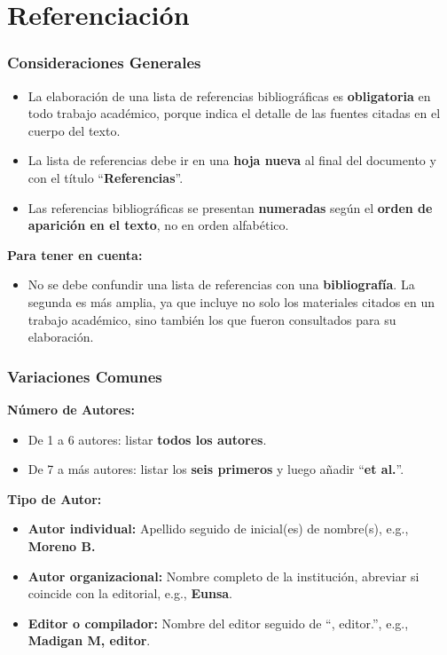 \documentclass[
11pt, %
]{beamer}
\begin{document}
\section{Referenciación}

\begin{frame}
	\frametitle{Consideraciones Generales}

	\begin{itemize}
		\item La elaboración de una lista de referencias bibliográficas es \textbf{obligatoria} en todo trabajo académico, porque indica el detalle de las fuentes citadas en el cuerpo del texto.
		\item La lista de referencias debe ir en una \textbf{hoja nueva} al final del documento y con el título “\textbf{Referencias}”.
		\item Las referencias bibliográficas se presentan \textbf{numeradas} según el \textbf{orden de aparición en el texto}, no en orden alfabético.
	\end{itemize}

	\textbf{Para tener en cuenta:}
	\begin{itemize}
		\item No se debe confundir una lista de referencias con una \textbf{bibliografía}. La segunda es más amplia, ya que incluye no solo los materiales citados en un trabajo académico, sino también los que fueron consultados para su elaboración.
	\end{itemize}

\end{frame}

\begin{frame}
	\frametitle{Variaciones Comunes}

	\textbf{Número de Autores:}
	\begin{itemize}
		\item De 1 a 6 autores: listar \textbf{todos los autores}.
		\item De 7 a más autores: listar los \textbf{seis primeros} y luego añadir “\textbf{et al.}”.
	\end{itemize}

	\textbf{Tipo de Autor:}
	\begin{itemize}
		\item \textbf{Autor individual:} Apellido seguido de inicial(es) de nombre(s), e.g., \textbf{Moreno B.}
		\item \textbf{Autor organizacional:} Nombre completo de la institución, abreviar si coincide con la editorial, e.g., \textbf{Eunsa}.
		\item \textbf{Editor o compilador:} Nombre del editor seguido de “, editor.”, e.g., \textbf{Madigan M, editor}.
	\end{itemize}

\end{frame}
\end{document}
